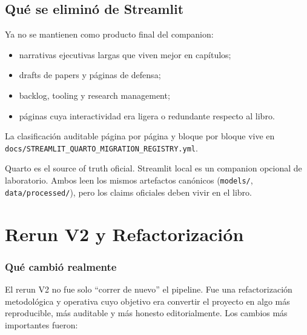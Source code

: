 \documentclass[
  spanish,
  11pt,
  letterpaper,
]{scrbook}
\providecommand{\tightlist}{%
  \setlength{\itemsep}{0pt}\setlength{\parskip}{0pt}}
\theoremstyle{plain}
\theoremstyle{remark}
\begin{document}
\section{Qué se eliminó de
Streamlit}\label{quuxe9-se-eliminuxf3-de-streamlit}

Ya no se mantienen como producto final del companion:

\begin{itemize}
\tightlist
\item
  narrativas ejecutivas largas que viven mejor en capítulos;
\item
  drafts de papers y páginas de defensa;
\item
  backlog, tooling y research management;
\item
  páginas cuya interactividad era ligera o redundante respecto al libro.
\end{itemize}

La clasificación auditable página por página y bloque por bloque vive en
\texttt{docs/STREAMLIT\_QUARTO\_MIGRATION\_REGISTRY.yml}.

\begin{tcolorbox}[enhanced jigsaw, arc=.35mm, bottomrule=.15mm, bottomtitle=1mm, breakable, colback=white, colbacktitle=quarto-callout-note-color!10!white, colframe=quarto-callout-note-color-frame, coltitle=black, left=2mm, leftrule=.75mm, opacityback=0, opacitybacktitle=0.6, rightrule=.15mm, title=\textcolor{quarto-callout-note-color}{\faInfo}\hspace{0.5em}{Regla de frontera editorial}, titlerule=0mm, toprule=.15mm, toptitle=1mm]

Quarto es el source of truth oficial. Streamlit local es un companion
opcional de laboratorio. Ambos leen los mismos artefactos canónicos
(\texttt{models/}, \texttt{data/processed/}), pero los claims oficiales
deben vivir en el libro.

\end{tcolorbox}

\chapter{Rerun V2 y Refactorización}\label{sec-rerun-v2}

\subsection{Qué cambió realmente}\label{quuxe9-cambiuxf3-realmente}

El rerun V2 no fue solo ``correr de nuevo'' el pipeline. Fue una
refactorización metodológica y operativa cuyo objetivo era convertir el
proyecto en algo más reproducible, más auditable y más honesto
editorialmente. Los cambios más importantes fueron:
\end{document}
